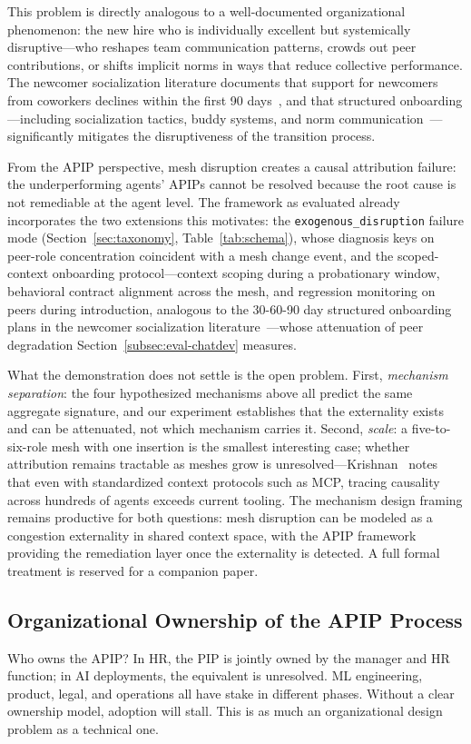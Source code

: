 This problem is directly analogous to a well-documented organizational
phenomenon: the new hire who is individually excellent but systemically
disruptive---who reshapes team communication patterns, crowds out peer
contributions, or shifts implicit norms in ways that reduce collective
performance. The newcomer socialization literature documents that support for
newcomers from coworkers declines within the first 90
days~\cite{kammeyer2013support}, and that structured onboarding---including
socialization tactics, buddy systems, and norm
communication~\cite{bauer2025newcomer,trainer2020membership}---significantly
mitigates the disruptiveness of the transition process.

From the APIP perspective, mesh disruption creates a causal attribution
failure: the underperforming agents' APIPs cannot be resolved because the root
cause is not remediable at the agent level. The framework as evaluated already
incorporates the two extensions this motivates: the
\texttt{exogenous\_disruption} failure mode
(Section~\ref{sec:taxonomy}, Table~\ref{tab:schema}), whose diagnosis keys on
peer-role concentration coincident with a mesh change event, and the
scoped-context onboarding protocol---context scoping during a probationary
window, behavioral contract alignment across the mesh, and regression
monitoring on peers during introduction, analogous to the 30-60-90 day
structured onboarding plans in the newcomer socialization
literature~\cite{bauer2025newcomer,kammeyer2013support}---whose attenuation of
peer degradation Section~\ref{subsec:eval-chatdev} measures.

What the demonstration does not settle is the open problem. First,
\emph{mechanism separation}: the four hypothesized mechanisms above all
predict the same aggregate signature, and our experiment establishes that the
externality exists and can be attenuated, not which mechanism carries it.
Second, \emph{scale}: a five-to-six-role mesh with one insertion is the
smallest interesting case; whether attribution remains tractable as meshes
grow is unresolved---Krishnan~\cite{krishnan2025mcp} notes that even with
standardized context protocols such as MCP, tracing causality across hundreds
of agents exceeds current tooling. The mechanism design framing remains
productive for both questions: mesh disruption can be modeled as a congestion
externality in shared context space, with the APIP framework providing the
remediation layer once the externality is detected. A full formal treatment is
reserved for a companion paper.

\subsection{Organizational Ownership of the APIP Process}
\label{subsec:ownership}

Who owns the APIP? In HR, the PIP is jointly owned by the manager and HR
function; in AI deployments, the equivalent is unresolved. ML engineering,
product, legal, and operations all have stake in different phases. Without a
clear ownership model, adoption will stall. This is as much an organizational
design problem as a technical one.
